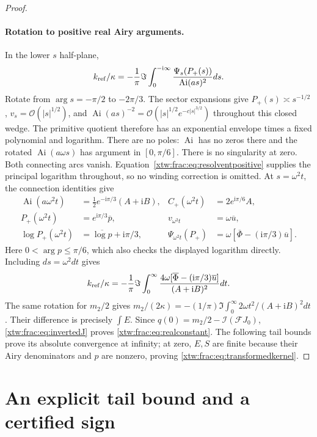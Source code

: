 \documentclass[11pt]{article}
\theoremstyle{remark}\newtheorem{remark}[theorem]{Remark}
\newcommand{\OO}{\mathcal O}
\newcommand{\Ai}{\operatorname{Ai}}
\newcommand{\ii}{\mathrm i}
\newcommand{\FF}{\mathcal F}
\newcommand{\inv}{\mathcal I}
\begin{document}
\begin{proof}
\paragraph{Rotation to positive real Airy arguments.}
In the lower $s$ half-plane,
\[
 k_{\rm ref}/\kappa=-\frac1\pi\Im
          \int_0^{-\ii\infty}\frac{\Psi_s(P_+(s))}{\Ai(as)^2}ds.
\]
Rotate from $\arg s=-\pi/2$ to $-2\pi/3$. The sector expansions give
$P_+(s)\asymp s^{-1/2}$, $v_s=\OO(|s|^{1/2})$, and
$\Ai(as)^{-2}=\OO(|s|^{1/2}e^{-c|s|^{3/2}})$ throughout this closed
wedge. The primitive quotient therefore has an exponential envelope times
a fixed polynomial and logarithm. There are no poles: $\Ai$ has no zeros
there and the rotated $\Ai(a\omega s)$ has argument in $[0,\pi/6]$.
There is no singularity at zero. Both connecting arcs vanish.
Equation~\eqref{xtw:frac:eq:resolventpositive} supplies the principal logarithm
throughout, so no winding correction is omitted.
At $s=\omega^2t$, the connection identities give
\begin{align*}
 \Ai(a\omega^2t)&=\tfrac12e^{-\ii\pi/3}(A+\ii B),&
 C_+(\omega^2t)&=2e^{\ii\pi/6}A,\\
 P_+(\omega^2t)&=e^{\ii\pi/3}\overline p,&
 v_{\omega^2t}&=\omega\overline u,\\
 \log P_+(\omega^2t)&=\overline{\log p}+\ii\pi/3,&
 \Psi_{\omega^2t}(P_+)&=\omega[\overline\Phi-(\ii\pi/3)\overline u].
\end{align*}
Here $0<\arg p\le\pi/6$, which also checks the displayed logarithm
directly. Including $ds=\omega^2dt$ gives
\[
 k_{\rm ref}/\kappa=-\frac1\pi\Im\int_0^\infty
 \frac{4\omega[\overline\Phi-(\ii\pi/3)\overline u]}{(A+\ii B)^2}dt.
\]
The same rotation for $m_2/2$ gives
$m_2/(2\kappa)=-(1/\pi)\Im\int_0^\infty
2\omega t^2/(A+\ii B)^2dt$.
Their difference is precisely $\int E$.
Since $q(0)=m_2/2-\inv(\FF J_0)$, \eqref{xtw:frac:eq:invertedJ} proves
\eqref{xtw:frac:eq:realconstant}. The following tail bounds prove its absolute
convergence at infinity; at zero, $E,S$ are finite because their Airy
denominators and $p$ are nonzero, proving \eqref{xtw:frac:eq:transformedkernel}.
\end{proof}

\section{An explicit tail bound and a certified sign}\label{xtw:frac:sec:certificate}
\end{document}
